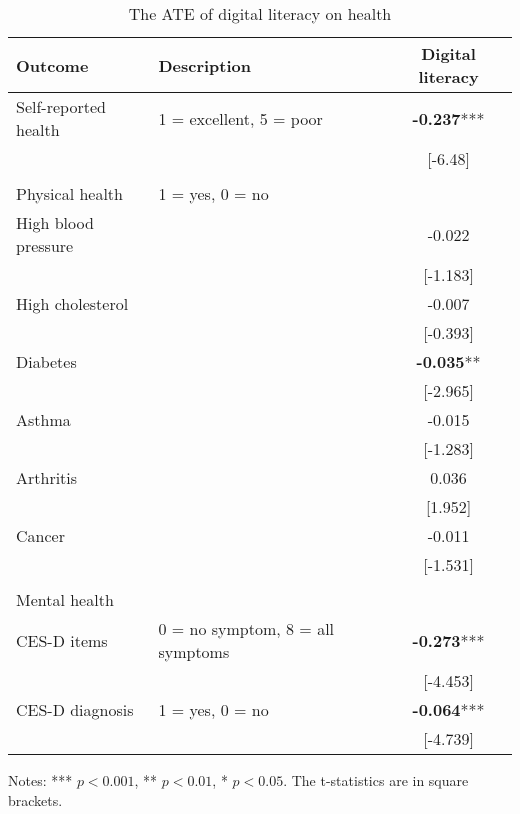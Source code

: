 \documentclass[11pt]{article}
\begin{document}
    \begin{table}[h!]
        \centering
        \caption{The ATE of digital literacy on health}
        \label{tab:ate}
        \begin{threeparttable}
            \begin{tabular}{llc}
                \toprule
                Outcome & Description & Digital literacy \\
                \midrule
                Self-reported health & 1 = excellent, 5 = poor & \textbf{-0.237}*** \\
                & & [-6.48] \\
                & & \\
                Physical health & 1 = yes, 0 = no & \\
                High blood pressure & & -0.022 \\
                & & [-1.183] \\
                High cholesterol & & -0.007 \\
                & & [-0.393] \\
                Diabetes & & \textbf{-0.035}** \\
                & & [-2.965] \\
                Asthma & & -0.015 \\
                & & [-1.283] \\
                Arthritis & & 0.036 \\
                & & [1.952] \\
                Cancer & & -0.011 \\
                & & [-1.531] \\
                & & \\
                Mental health & & \\
                CES-D items & 0 = no symptom, 8 = all symptoms & \textbf{-0.273}*** \\
                & & [-4.453] \\
                CES-D diagnosis & 1 = yes, 0 = no & \textbf{-0.064}*** \\
                & & [-4.739] \\
                \bottomrule
            \end{tabular}
            \begin{tablenotes}
                \footnotesize
                \item Notes: *** $p < 0.001$, ** $p < 0.01$, * $p < 0.05$. The t-statistics are in square brackets.
            \end{tablenotes}
        \end{threeparttable}
    \end{table}
\end{document}
